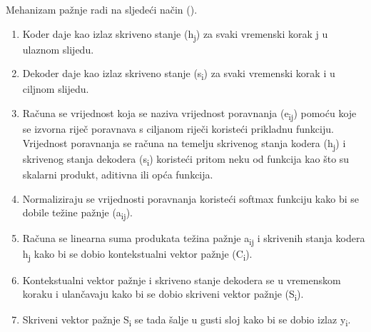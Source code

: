 \documentclass[times, utf8, zavrsni, numeric]{fer}
\begin{document}
Mehanizam pažnje radi na sljedeći način (\citet{article3}).
\begin{enumerate}
    \item Koder daje kao izlaz skriveno stanje (h\textsubscript{j}) za svaki vremenski korak j u ulaznom slijedu.
    \item Dekoder daje kao izlaz skriveno stanje (s\textsubscript{i}) za svaki vremenski korak i u ciljnom slijedu.
    \item Računa se vrijednost koja se naziva vrijednost poravnanja (e\textsubscript{ij}) pomoću koje se izvorna riječ poravnava s ciljanom riječi koristeći prikladnu funkciju. Vrijednost poravnanja se računa na temelju skrivenog stanja kodera (h\textsubscript{j}) i skrivenog stanja dekodera (s\textsubscript{i}) koristeći pritom neku od funkcija kao što su skalarni produkt, aditivna ili opća funkcija.
    \item Normaliziraju se vrijednosti poravnanja koristeći softmax funkciju kako bi se dobile težine pažnje (a\textsubscript{ij}).
    \item Računa se linearna suma produkata težina pažnje a\textsubscript{ij} i skrivenih stanja kodera h\textsubscript{j} kako bi se dobio kontekstualni vektor pažnje (C\textsubscript{i}).
    \item Kontekstualni vektor pažnje i skriveno stanje dekodera se u vremenskom koraku i ulančavaju kako bi se dobio skriveni vektor pažnje (S\textsubscript{i}).
    \item Skriveni vektor pažnje S\textsubscript{i} se tada šalje u gusti sloj kako bi se dobio izlaz y\textsubscript{i}.
\end{enumerate}
\end{document}
